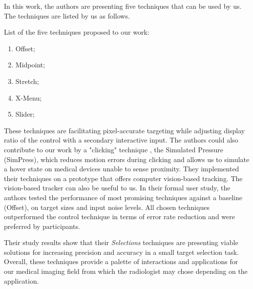 In this work, the authors are presenting five techniques that can be used by us. The techniques are listed by us as follows.

\hfill

List of the five techniques proposed to our work:

\hfill

\begin{enumerate}
\item Offset;
\item Midpoint;
\item Stretch;
\item X-Menu;
\item Slider;
\end{enumerate}

\hfill

These techniques are facilitating pixel-accurate targeting while adjusting display ratio of the control with a secondary interactive input. The authors could also contribute to our work by a "clicking" technique , the Simulated Pressure (SimPress), which reduces motion errors during clicking and allows us to simulate a hover state on medical devices unable to sense proximity. They implemented their techniques on a prototype that offers computer vision-based tracking. The vision-based tracker can also be useful to us. In their formal user study, the authors tested the performance of most promising techniques against a baseline (Offset), on target sizes and input noise levels. All chosen techniques outperformed the control technique in terms of error rate reduction and were preferred by participants.

Their study results show that their \textit{Selections} techniques are presenting viable solutions for increasing precision and accuracy in a small target selection task. Overall, these techniques provide a palette of interactions and applications for our medical imaging field from which the radiologist may chose depending on the application.